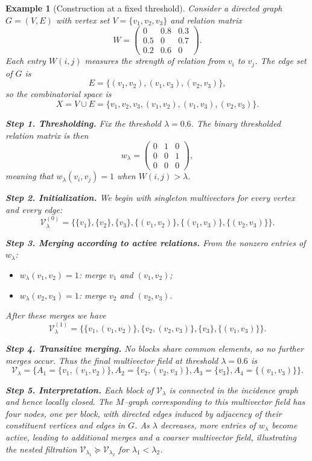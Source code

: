 \documentclass{article}
\theoremstyle{definition}
\theoremstyle{plain}
\newtheorem{example}{Example}
\theoremstyle{remark}
\newcommand{\1}{\mathbbm{1}}  %
\begin{document}
\begin{example}[Construction at a fixed threshold]
\label{ex:construction}
Consider a directed graph \(G=(V,E)\) with vertex set
\(V=\{v_1,v_2,v_3\}\) and relation matrix
\[
W =
\begin{pmatrix}
0 & 0.8 & 0.3 \\
0.5 & 0 & 0.7 \\
0.2 & 0.6 & 0
\end{pmatrix}.
\]
Each entry \(W(i,j)\) measures the strength of relation from \(v_i\) to \(v_j\).
The edge set of \(G\) is
\[
E = \{(v_1,v_2), (v_1,v_3), (v_2,v_3)\},
\]
so the combinatorial space is
\[
X = V \cup E = \{v_1, v_2, v_3, (v_1,v_2), (v_1,v_3), (v_2,v_3)\}.
\]

\medskip\noindent
\textbf{Step 1. Thresholding.}
Fix the threshold \(\lambda = 0.6\).
The binary thresholded relation matrix is then
\[
w_\lambda =
\begin{pmatrix}
0 & 1 & 0 \\
0 & 0 & 1 \\
0 & 0 & 0
\end{pmatrix},
\]
meaning that \(w_\lambda(v_i,v_j)=1\) when \(W(i,j)>\lambda\).

\medskip\noindent
\textbf{Step 2. Initialization.}
We begin with singleton multivectors for every vertex and every edge:
\[
\mathcal V_\lambda^{(0)} =
\{\{v_1\}, \{v_2\}, \{v_3\},
  \{(v_1,v_2)\}, \{(v_1,v_3)\}, \{(v_2,v_3)\}\}.
\]

\medskip\noindent
\textbf{Step 3. Merging according to active relations.}
From the nonzero entries of \(w_\lambda\):
\begin{itemize}
  \item \(w_\lambda(v_1,v_2)=1\): merge \(v_1\) and \((v_1,v_2)\);
  \item \(w_\lambda(v_2,v_3)=1\): merge \(v_2\) and \((v_2,v_3)\).
\end{itemize}
After these merges we have
\[
\mathcal V_\lambda^{(1)} =
\{\{v_1,(v_1,v_2)\}, \{v_2,(v_2,v_3)\}, \{v_3\}, \{(v_1,v_3)\}\}.
\]

\medskip\noindent
\textbf{Step 4. Transitive merging.}
No blocks share common elements, so no further merges occur.
Thus the final multivector field at threshold \(\lambda=0.6\) is
\[
\mathcal V_\lambda = 
\{A_1=\{v_1,(v_1,v_2)\}, A_2=\{v_2,(v_2,v_3)\}, A_3=\{v_3\}, A_4=\{(v_1,v_3)\}\}.
\]

\medskip\noindent
\textbf{Step 5. Interpretation.}
Each block of \(\mathcal V_\lambda\) is connected in the incidence graph
and hence locally closed.
The $M$--graph corresponding to this multivector field has four nodes,
one per block, with directed edges induced by adjacency of their
constituent vertices and edges in \(G\).
As \(\lambda\) decreases, more entries of \(w_\lambda\) become active,
leading to additional merges and a coarser multivector field,
illustrating the nested filtration
\(\mathcal V_{\lambda_1} \succeq \mathcal V_{\lambda_2}\)
for \(\lambda_1<\lambda_2\).



\end{example}
\end{document}
